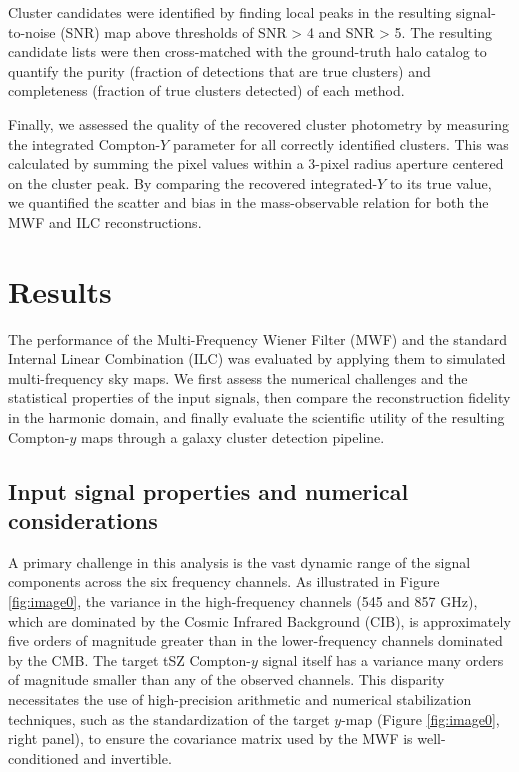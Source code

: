 \documentclass[]{article}
\begin{document}
Cluster candidates were identified by finding local peaks in the resulting signal-to-noise (SNR) map above thresholds of SNR > 4 and SNR > 5. The resulting candidate lists were then cross-matched with the ground-truth halo catalog to quantify the purity (fraction of detections that are true clusters) and completeness (fraction of true clusters detected) of each method.

Finally, we assessed the quality of the recovered cluster photometry by measuring the integrated Compton-$Y$ parameter for all correctly identified clusters. This was calculated by summing the pixel values within a 3-pixel radius aperture centered on the cluster peak. By comparing the recovered integrated-$Y$ to its true value, we quantified the scatter and bias in the mass-observable relation for both the MWF and ILC reconstructions.

\section{Results}
\label{sec:results}
The performance of the Multi-Frequency Wiener Filter (MWF) and the standard Internal Linear Combination (ILC) was evaluated by applying them to simulated multi-frequency sky maps. We first assess the numerical challenges and the statistical properties of the input signals, then compare the reconstruction fidelity in the harmonic domain, and finally evaluate the scientific utility of the resulting Compton-$y$ maps through a galaxy cluster detection pipeline.

\subsection{Input signal properties and numerical considerations}

A primary challenge in this analysis is the vast dynamic range of the signal components across the six frequency channels. As illustrated in Figure \ref{fig:image0}, the variance in the high-frequency channels (545 and 857 GHz), which are dominated by the Cosmic Infrared Background (CIB), is approximately five orders of magnitude greater than in the lower-frequency channels dominated by the CMB. The target tSZ Compton-$y$ signal itself has a variance many orders of magnitude smaller than any of the observed channels. This disparity necessitates the use of high-precision arithmetic and numerical stabilization techniques, such as the standardization of the target $y$-map (Figure \ref{fig:image0}, right panel), to ensure the covariance matrix used by the MWF is well-conditioned and invertible.
\end{document}
